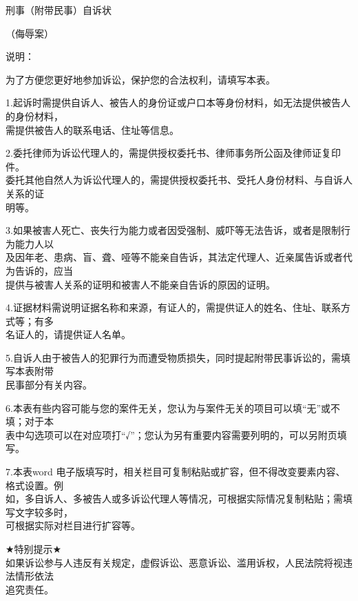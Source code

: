 \documentclass[a4paper,12pt,twoside]{ctexart}
\newcommand{\lawtitle}[2]{
    \vspace*{0.507cm} 
    \begin{center}
        {\fzdbs\fontsize{22bp}{22bp}\selectfont #1}\par
        \vspace{10.37bp} %
        {\fzdbs\fontsize{18bp}{18bp}\selectfont #2}\par
    \end{center}
    \vspace{18.4bp} %
}
\newcommand{\lawpar}{\par\vspace*{-4.86bp}}
\begin{document}
\lawtitle{刑事（附带民事）自诉状}{（侮辱案）}

\begin{notesection}
\hfuzz=50pt %
\color{inkblack}\heiti\fontsize{10.5bp}{16bp}\selectfont 说明：\par
\vspace*{-0.2bp}
\songti\mdseries\fontsize{10.5bp}{16bp}\selectfont %
\setlength{\parindent}{20.7bp} %
\sloppy %

\setlength{\parskip}{0pt}
\vspace*{-5.1bp}为了方便您更好地参加诉讼，保护您的合法权利，请填写本表。
\lawpar
1.起诉时需提供自诉人、被告人的身份证或户口本等身份材料，如无法提供被告人的身份材料，\\[-4.86bp]
需提供被告人的联系电话、住址等信息。
\lawpar
2.委托律师为诉讼代理人的，需提供授权委托书、律师事务所公函及律师证复印件。\\[-4.86bp]
\hspace*{31.2bp}委托其他自然人为诉讼代理人的，需提供授权委托书、受托人身份材料、与自诉人关系的证\\[-4.86bp]
明等。
\lawpar
3.如果被害人死亡、丧失行为能力或者因受强制、威吓等无法告诉，或者是限制行为能力人以\\[-4.86bp]
及因年老、患病、盲、聋、哑等不能亲自告诉，其法定代理人、近亲属告诉或者代为告诉的，应当\\[-4.86bp]
提供与被害人关系的证明和被害人不能亲自告诉的原因的证明。
\lawpar
4.证据材料需说明证据名称和来源，有证人的，需提供证人的姓名、住址、联系方式等；有多\\[-4.86bp]
名证人的，请提供证人名单。
\lawpar
5.自诉人由于被告人的犯罪行为而遭受物质损失，同时提起附带民事诉讼的，需填写本表附带\\[-4.86bp]
民事部分有关内容。
\lawpar
6.本表有些内容可能与您的案件无关，您认为与案件无关的项目可以填“无”或不填；对于本\\[-4.86bp]
表中勾选项可以在对应项打“√”；您认为另有重要内容需要列明的，可以另附页填写。
\lawpar
7.本表word 电子版填写时，相关栏目可复制粘贴或扩容，但不得改变要素内容、格式设置。例\\[-4.86bp]
如，多自诉人、多被告人或多诉讼代理人等情况，可根据实际情况复制粘贴；需填写文字较多时，\\[-4.86bp]
可根据实际对栏目进行扩容等。
\lawpar
$\bigstar$特别提示$\bigstar$\\[-4.86bp]
\hspace*{20.7bp}如果诉讼参与人违反有关规定，虚假诉讼、恶意诉讼、滥用诉权，人民法院将视违法情形依法\\[-4.86bp]
追究责任。
\end{notesection}
\end{document}
